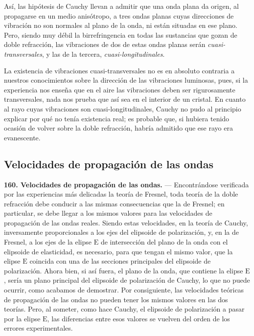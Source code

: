 Así, las hipótesis de Cauchy llevan a admitir que una onda plana da
origen, al propagarse en un medio anisótropo, a tres ondas planas cuyas
direcciones de vibración no son normales al plano de la onda, ni están
situadas en ese plano. Pero, siendo muy débil la birrefringencia en todas
las sustancias que gozan de doble refracción, las vibraciones de dos de
estas ondas planas serán \emph{cuasi-transversales}, y las de la tercera,
\emph{cuasi-longitudinales}.

La existencia de vibraciones cuasi-transversales no es en absoluto
contraria a nuestros conocimientos sobre la dirección de las vibraciones
luminosas, pues, si la experiencia nos enseña que en el aire las
vibraciones deben ser rigurosamente transversales, nada nos prueba que
así sea en el interior de un cristal. En cuanto al rayo cuyas vibraciones
son cuasi-longitudinales, Cauchy no pudo al principio explicar por qué no
tenía existencia real; es probable que, si hubiera tenido ocasión de
volver sobre la doble refracción, habría admitido que ese rayo era
evanescente.

\subsection{Velocidades de propagación de las ondas}

\noindent\textbf{160. Velocidades de propagación de las ondas.} —
Encontrándose verificada por las experiencias más delicadas la teoría de
Fresnel, toda teoría de la doble refracción debe conducir a las mismas
consecuencias que la de Fresnel; en particular, se debe llegar a los
mismos valores para las velocidades de propagación de las ondas reales.
Siendo estas velocidades, en la teoría de Cauchy, inversamente
proporcionales a los ejes del elipsoide de polarización, y, en la de
Fresnel, a los ejes de la elipse $\mathrm E$ de intersección del plano de
la onda con el elipsoide de elasticidad, es necesario, para que tengan el
mismo valor, que la elipse $\mathrm E$ coincida con una de las secciones
principales del elipsoide de polarización. Ahora bien, si así fuera, el
plano de la onda, que contiene la elipse $\mathrm E$, sería un plano
principal del elipsoide de polarización de Cauchy, lo que no puede
ocurrir, como acabamos de demostrar. Por consiguiente, las velocidades
teóricas de propagación de las ondas no pueden tener los mismos valores en
las dos teorías. Pero, al someter, como hace Cauchy, el elipsoide de
polarización a pasar por la elipse $\mathrm E$, las diferencias entre
esos valores se vuelven del orden de los errores experimentales.

